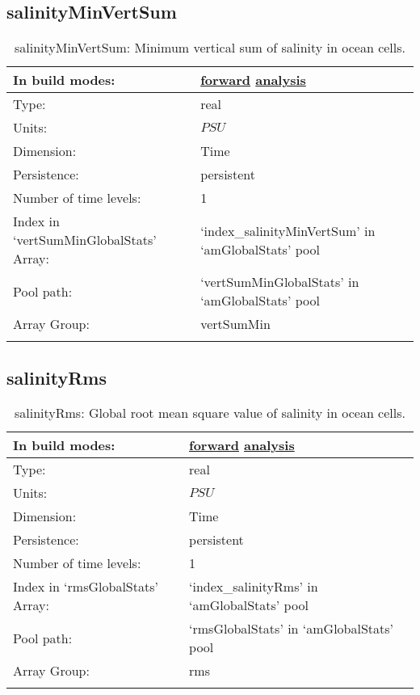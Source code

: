 \subsection[salinityMinVertSum]{salinityMinVertSum}
\label{subsec:var_sec_amGlobalStats_salinityMinVertSum}
\begin{center}
\begin{longtable}{| p{2.0in} | p{4.0in} |}
        \hline 
        In build modes: & \hyperref[subsec:forward_var_tab_amGlobalStats]{forward} \hyperref[subsec:analysis_var_tab_amGlobalStats]{analysis} \\
        \hline 
        Type: & real \\
        \hline 
        Units: & $PSU$ \\
        \hline 
        Dimension: & Time \\
        \hline 
        Persistence: & persistent \\
        \hline 
        Number of time levels: & 1 \\
        \hline 
		 Index in `vertSumMinGlobalStats' Array: & `index\_salinityMinVertSum' in `amGlobalStats' pool \\
		 \hline 
            Pool path: & `vertSumMinGlobalStats' in `amGlobalStats' pool \\
		 \hline 
		 Array Group: & vertSumMin \\
		 \hline 
    \caption{salinityMinVertSum: Minimum vertical sum of salinity in ocean cells.}
\end{longtable}
\end{center}
\subsection[salinityRms]{salinityRms}
\label{subsec:var_sec_amGlobalStats_salinityRms}
\begin{center}
\begin{longtable}{| p{2.0in} | p{4.0in} |}
        \hline 
        In build modes: & \hyperref[subsec:forward_var_tab_amGlobalStats]{forward} \hyperref[subsec:analysis_var_tab_amGlobalStats]{analysis} \\
        \hline 
        Type: & real \\
        \hline 
        Units: & $PSU$ \\
        \hline 
        Dimension: & Time \\
        \hline 
        Persistence: & persistent \\
        \hline 
        Number of time levels: & 1 \\
        \hline 
		 Index in `rmsGlobalStats' Array: & `index\_salinityRms' in `amGlobalStats' pool \\
		 \hline 
            Pool path: & `rmsGlobalStats' in `amGlobalStats' pool \\
		 \hline 
		 Array Group: & rms \\
		 \hline 
    \caption{salinityRms: Global root mean square value of salinity in ocean cells.}
\end{longtable}
\end{center}
